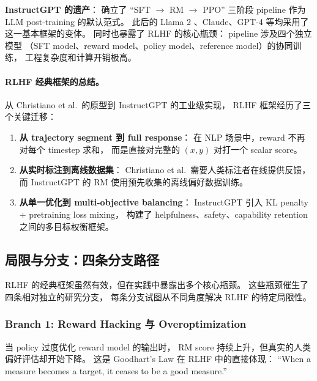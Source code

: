 \begin{solutionbox}
\textbf{InstructGPT 的遗产}：
确立了 ``SFT $\rightarrow$ RM $\rightarrow$ PPO'' 三阶段 pipeline 作为 LLM post-training 的默认范式。
此后的 Llama 2 \cite{touvron2023llama2}、Claude、GPT-4 等均采用了这一基本框架的变体。
同时也暴露了 RLHF 的核心瓶颈：
pipeline 涉及四个独立模型
（SFT model、reward model、policy model、reference model）的协同训练，
工程复杂度和计算开销极高。
\end{solutionbox}

\paragraph{RLHF 经典框架的总结。}
从 Christiano et al.\ 的原型到 InstructGPT 的工业级实现，
RLHF 框架经历了三个关键迁移：

\begin{enumerate}[leftmargin=2em]
  \item \textbf{从 trajectory segment 到 full response}：
    在 NLP 场景中，reward 不再对每个 timestep 求和，
    而是直接对完整的 $(x, y)$ 对打一个 scalar score。
  \item \textbf{从实时标注到离线数据集}：
    Christiano et al.\ 需要人类标注者在线提供反馈，
    而 InstructGPT 的 RM 使用预先收集的离线偏好数据训练。
  \item \textbf{从单一优化到 multi-objective balancing}：
    InstructGPT 引入 KL penalty + pretraining loss mixing，
    构建了 helpfulness、safety、capability retention 之间的多目标权衡框架。
\end{enumerate}

\subsection{局限与分支：四条分支路径}
\label{sec:t2-branches}

RLHF 的经典框架虽然有效，但在实践中暴露出多个核心瓶颈。
这些瓶颈催生了四条相对独立的研究分支，
每条分支试图从不同角度解决 RLHF 的特定局限性。

\subsubsection{Branch 1: Reward Hacking 与 Overoptimization}
\label{sec:t2-reward-hacking}

\begin{problembox}
当 policy 过度优化 reward model 的输出时，
RM score 持续上升，但真实的人类偏好评估却开始下降。
这是 Goodhart's Law 在 RLHF 中的直接体现：
``When a measure becomes a target, it ceases to be a good measure.''
\end{problembox}

